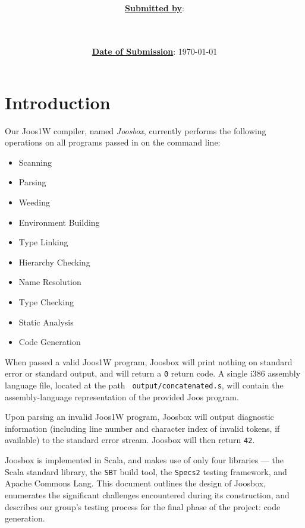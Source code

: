 \documentclass[letterpaper]{article}
\title{\course \\ \term \\ \project}
\date{\ul{\textbf{Date of Submission}}: \today}
\author{\ul{\textbf{Submitted by}}: \\ \indent \wenhao \\ \indent \chris \\ \indent \peter}
\begin{document}
  \maketitle
  \thispagestyle{empty}
  \clearpage

  \setcounter{page}{1}

  \clearpage
  \section{Introduction}

  Our Joos1W compiler, named {\em Joosbox}, currently performs the following
  operations on all programs passed in on the command line:

  \begin{itemize}
    \item Scanning
    \item Parsing
    \item Weeding
    \item Environment Building
    \item Type Linking
    \item Hierarchy Checking
    \item Name Resolution
    \item Type Checking
    \item Static Analysis
    \item Code Generation
  \end{itemize}

  When passed a valid Joos1W program, Joosbox will print nothing on standard
  error or standard output, and will return a {\tt 0} return code. A single
  i386 assembly language file, located at the path {\tt
  output/concatenated.s}, will contain the assembly-language representation of
  the provided Joos program.

  Upon parsing an invalid Joos1W program, Joosbox will output diagnostic
  information (including line number and character index of invalid tokens, if
  available) to the standard error stream. Joosbox will then return {\tt 42}.

  Joosbox is implemented in Scala, and makes use of only four libraries ---
  the Scala standard library, the {\tt SBT} build tool, the {\tt Specs2}
  testing framework, and Apache Commons Lang. This document outlines the
  design of Joosbox, enumerates the significant challenges encountered during
  its construction, and describes our group's testing process for the final
  phase of the project: code generation.
\end{document}
